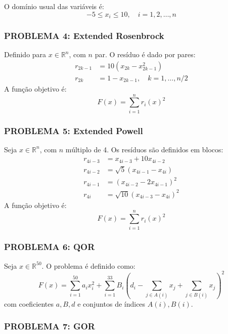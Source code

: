 \documentclass[12pt,a4paper]{article}
\begin{document}
O domínio usual das variáveis é:
\begin{equation}
    -5 \leq x_i \leq 10, \quad i = 1, 2, \ldots, n
\end{equation}

\subsubsection{\textbf{PROBLEMA 4: Extended Rosenbrock}}

Definido para $x \in \mathbb{R}^n$, com $n$ par. O resíduo é dado por pares:
\begin{align}
r_{2k-1} &= 10(x_{2k} - x_{2k-1}^2) \\
r_{2k} &= 1 - x_{2k-1}, \quad k=1,\dots,n/2
\end{align}
A função objetivo é:
\begin{equation}
F(x) = \sum_{i=1}^n r_i(x)^2
\end{equation}

\subsubsection{\textbf{PROBLEMA 5: Extended Powell}}

Seja $x \in \mathbb{R}^n$, com $n$ múltiplo de 4. Os resíduos são definidos em blocos:
\begin{align}
r_{4i-3} &= x_{4i-3} + 10x_{4i-2} \\
r_{4i-2} &= \sqrt{5}(x_{4i-1} - x_{4i}) \\
r_{4i-1} &= (x_{4i-2} - 2x_{4i-1})^2 \\
r_{4i} &= \sqrt{10}(x_{4i-3} - x_{4i})^2
\end{align}
A função objetivo é:
\begin{equation}
F(x) = \sum_{i=1}^n r_i(x)^2
\end{equation}

\subsubsection{\textbf{PROBLEMA 6: QOR}}

Seja $x \in \mathbb{R}^{50}$. O problema é definido como:
\begin{equation}
F(x) = \sum_{i=1}^{50} a_i x_i^2 + \sum_{i=1}^{33} B_i \left( d_i - \sum_{j \in A(i)} x_j + \sum_{j \in B(i)} x_j \right)^2
\end{equation}
com coeficientes $a, B, d$ e conjuntos de índices $A(i), B(i)$.

\subsubsection{\textbf{PROBLEMA 7: GOR}}
\end{document}
